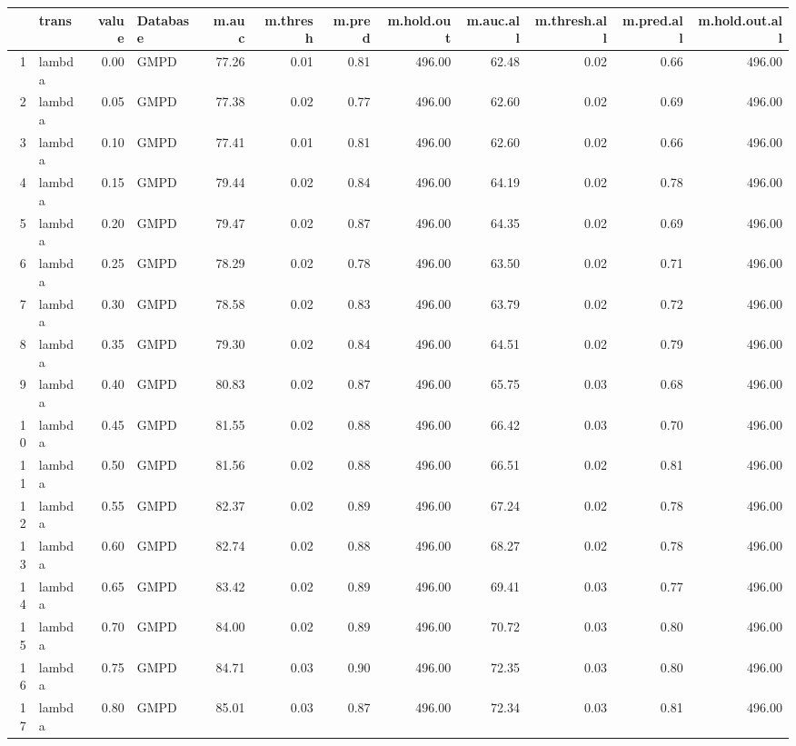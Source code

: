 \begin{table}[ht]
\centering
\begin{tabular}{rlrlrrrrrrrr}
  \hline
 & trans & value & Database & m.auc & m.thresh & m.pred & m.hold.out & m.auc.all & m.thresh.all & m.pred.all & m.hold.out.all \\ 
  \hline
1 & lambda & 0.00 & GMPD & 77.26 & 0.01 & 0.81 & 496.00 & 62.48 & 0.02 & 0.66 & 496.00 \\ 
  2 & lambda & 0.05 & GMPD & 77.38 & 0.02 & 0.77 & 496.00 & 62.60 & 0.02 & 0.69 & 496.00 \\ 
  3 & lambda & 0.10 & GMPD & 77.41 & 0.01 & 0.81 & 496.00 & 62.60 & 0.02 & 0.66 & 496.00 \\ 
  4 & lambda & 0.15 & GMPD & 79.44 & 0.02 & 0.84 & 496.00 & 64.19 & 0.02 & 0.78 & 496.00 \\ 
  5 & lambda & 0.20 & GMPD & 79.47 & 0.02 & 0.87 & 496.00 & 64.35 & 0.02 & 0.69 & 496.00 \\ 
  6 & lambda & 0.25 & GMPD & 78.29 & 0.02 & 0.78 & 496.00 & 63.50 & 0.02 & 0.71 & 496.00 \\ 
  7 & lambda & 0.30 & GMPD & 78.58 & 0.02 & 0.83 & 496.00 & 63.79 & 0.02 & 0.72 & 496.00 \\ 
  8 & lambda & 0.35 & GMPD & 79.30 & 0.02 & 0.84 & 496.00 & 64.51 & 0.02 & 0.79 & 496.00 \\ 
  9 & lambda & 0.40 & GMPD & 80.83 & 0.02 & 0.87 & 496.00 & 65.75 & 0.03 & 0.68 & 496.00 \\ 
  10 & lambda & 0.45 & GMPD & 81.55 & 0.02 & 0.88 & 496.00 & 66.42 & 0.03 & 0.70 & 496.00 \\ 
  11 & lambda & 0.50 & GMPD & 81.56 & 0.02 & 0.88 & 496.00 & 66.51 & 0.02 & 0.81 & 496.00 \\ 
  12 & lambda & 0.55 & GMPD & 82.37 & 0.02 & 0.89 & 496.00 & 67.24 & 0.02 & 0.78 & 496.00 \\ 
  13 & lambda & 0.60 & GMPD & 82.74 & 0.02 & 0.88 & 496.00 & 68.27 & 0.02 & 0.78 & 496.00 \\ 
  14 & lambda & 0.65 & GMPD & 83.42 & 0.02 & 0.89 & 496.00 & 69.41 & 0.03 & 0.77 & 496.00 \\ 
  15 & lambda & 0.70 & GMPD & 84.00 & 0.02 & 0.89 & 496.00 & 70.72 & 0.03 & 0.80 & 496.00 \\ 
  16 & lambda & 0.75 & GMPD & 84.71 & 0.03 & 0.90 & 496.00 & 72.35 & 0.03 & 0.80 & 496.00 \\ 
  17 & lambda & 0.80 & GMPD & 85.01 & 0.03 & 0.87 & 496.00 & 72.34 & 0.03 & 0.81 & 496.00 \\ 

\end{tabular}
\end{table}
